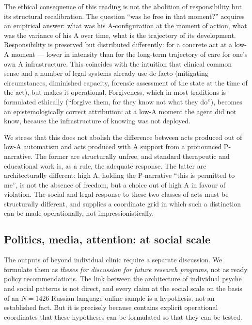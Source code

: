 The ethical consequence of this reading is not the abolition of responsibility but its structural recalibration. The question ``was he free in that moment?'' acquires an empirical answer: what was his A-configuration at the moment of action, what was the variance of his A over time, what is the trajectory of its development. Responsibility is preserved but distributed differently: for a concrete act at a low-A moment --- lower in intensity than for the long-term trajectory of care for one's own A infrastructure. This coincides with the intuition that clinical common sense and a number of legal systems already use de facto (mitigating circumstances, diminished capacity, forensic assessment of the state at the time of the act), but makes it operational. Forgiveness, which in most traditions is formulated ethically (``forgive them, for they know not what they do''), becomes an epistemologically correct attribution: at a low-A moment the agent did not know, because the infrastructure of knowing was not deployed.

We stress that this does not abolish the difference between acts produced out of low-A automatism and acts produced with A support from a pronounced P-narrative. The former are structurally unfree, and standard therapeutic and educational work is, as a rule, the adequate response. The latter are architecturally different: high A, holding the P-narrative ``this is permitted to me'', is not the absence of freedom, but a choice out of high A in favour of violation. The social and legal response to these two classes of acts must be structurally different, and \DEIC{} supplies a coordinate grid in which such a distinction can be made operationally, not impressionistically.

\subsection{Politics, media, attention: \DEIC{} at social scale}
\label{subsec:political}

The outputs of \DEIC{} beyond individual clinic require a separate discussion. We formulate them as \emph{theses for discussion for future research programs}, not as ready policy recommendations. The link between the architecture of individual psyche and social patterns is not direct, and every claim at the social scale on the basis of an $N = 1426$ Russian-language online sample is a hypothesis, not an established fact. But it is precisely because \DEIC{} contains explicit operational coordinates that these hypotheses can be formulated so that they can be tested.

